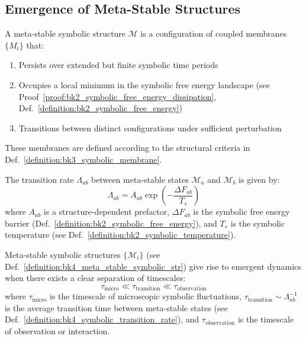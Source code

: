 \subsection{Emergence of Meta-Stable Structures} \label{subsec:bk4_emergence_meta_stable_structures}
\begin{definition} \label{definition:bk4_meta_stable_symbolic_str}
A meta-stable symbolic structure $\mathcal{M}$ is a configuration of coupled membranes $\{M_i\}$ that:
\begin{enumerate}
    \item Persists over extended but finite symbolic time periods
    \item Occupies a local minimum in the symbolic free energy landscape (see Proof~\ref{proof:bk2_symbolic_free_energy_dissipation}, Def.~\ref{definition:bk2_symbolic_free_energy})
    \item Transitions between distinct configurations under sufficient perturbation
\end{enumerate}
These membranes are defined according to the structural criteria in Def.~\ref{definition:bk3_symbolic_membrane}.
\end{definition}
\begin{definition} \label{definition:bk4_symbolic_transition_rate}
The transition rate $\Lambda_{ab}$ between meta-stable states $\mathcal{M}_a$ and $\mathcal{M}_b$ is given by:
\begin{equation}
    \Lambda_{ab} = A_{ab} \exp\left(-\frac{\Delta F_{ab}}{T_s}\right)
\end{equation}
where $A_{ab}$ is a structure-dependent prefactor, $\Delta F_{ab}$ is the symbolic free energy barrier (Def.~\ref{definition:bk2_symbolic_free_energy}), and $T_s$ is the symbolic temperature (see Def.~\ref{definition:bk2_symbolic_temperature}).
\end{definition}
\begin{theorem} \label{theorem:bk4_emergence_through_timescale_separation}
Meta-stable symbolic structures $\{\mathcal{M}_i\}$ (see Def.~\ref{definition:bk4_meta_stable_symbolic_str}) give rise to emergent dynamics when there exists a clear separation of timescales:
\begin{equation}
    \tau_{\text{micro}} \ll \tau_{\text{transition}} \ll \tau_{\text{observation}}
\end{equation}
where $\tau_{\text{micro}}$ is the timescale of microscopic symbolic fluctuations, $\tau_{\text{transition}} \sim \Lambda_{ab}^{-1}$ is the average transition time between meta-stable states (see Def.~\ref{definition:bk4_symbolic_transition_rate}), and $\tau_{\text{observation}}$ is the timescale of observation or interaction.
\end{theorem}
